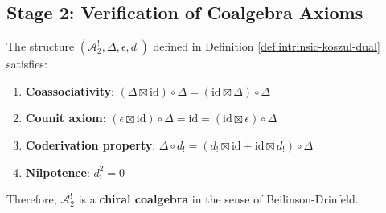 
\subsection{Stage 2: Verification of Coalgebra Axioms}

\begin{theorem}
\label{thm:coalgebra-axioms-verified}

The structure $(\mathcal{A}_2^!, \Delta, \epsilon, d_!)$ defined in Definition \ref{def:intrinsic-koszul-dual} satisfies:

\begin{enumerate}
\item \textbf{Coassociativity}: $(\Delta \boxtimes \mathrm{id}) \circ \Delta = (\mathrm{id} \boxtimes \Delta) \circ \Delta$

\item \textbf{Counit axiom}: $(\epsilon \boxtimes \mathrm{id}) \circ \Delta = \mathrm{id} = (\mathrm{id} \boxtimes \epsilon) \circ \Delta$

\item \textbf{Coderivation property}: $\Delta \circ d_! = (d_! \boxtimes \mathrm{id} + \mathrm{id} \boxtimes d_!) \circ \Delta$

\item \textbf{Nilpotence}: $d_!^2 = 0$
\end{enumerate}

Therefore, $\mathcal{A}_2^!$ is a \textbf{chiral coalgebra} in the sense of Beilinson-Drinfeld.
\end{theorem}

